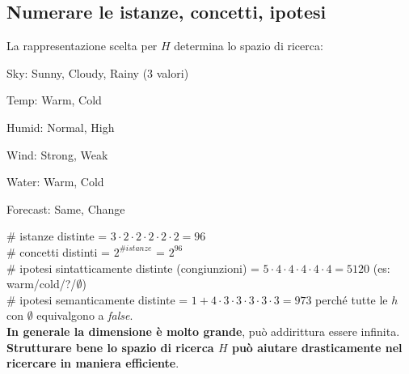 \documentclass[10pt]{book}
\begin{document}
\subsection{Numerare le istanze, concetti, ipotesi}
La rappresentazione scelta per $H$ determina lo spazio di ricerca:
\begin{list}{}{}
	\item Sky: Sunny, Cloudy, Rainy (3 valori)
	\item Temp: Warm, Cold
	\item Humid: Normal, High
	\item Wind: Strong, Weak
	\item Water: Warm, Cold
	\item Forecast: Same, Change
\end{list}
\# istanze distinte = $3\cdot2\cdot2\cdot2\cdot2\cdot2 = 96$\\
\# concetti distinti = $2^{\# istanze}$ = $2^{96}$\\
\# ipotesi sintatticamente distinte (congiunzioni) = $5\cdot4\cdot4\cdot4\cdot4\cdot4 = 5120$ (es: warm/cold/?/$\emptyset$)\\
\# ipotesi semanticamente distinte = $1 + 4\cdot3\cdot3\cdot3\cdot3\cdot3 = 973$ perché tutte le $h$ con $\emptyset$ equivalgono a \textit{false}.\\
\textbf{In generale la dimensione è molto grande}, può addirittura essere infinita. \textbf{Strutturare bene lo spazio di ricerca $H$ può aiutare drasticamente nel ricercare in maniera efficiente}.
\end{document}

